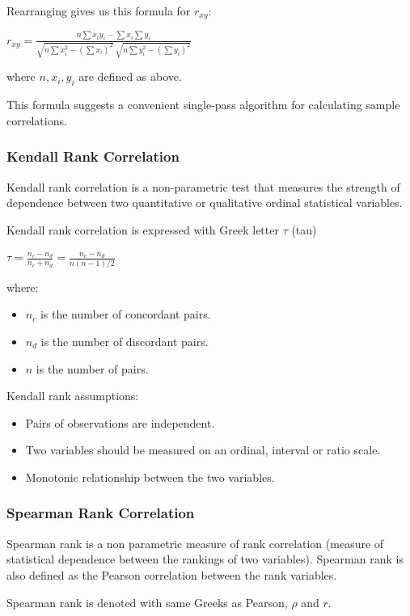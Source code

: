 \documentclass{article}
\begin{document}
Rearranging gives us this formula for $\displaystyle r_{xy}$:

${\displaystyle r_{xy}={\frac {n\sum x_{i}y_{i}-\sum x_{i}\sum y_{i}}{{\sqrt {n\sum x_{i}^{2}-\left(\sum x_{i}\right)^{2}}}~{\sqrt {n\sum y_{i}^{2}-\left(\sum y_{i}\right)^{2}}}}}}$

where $n,x_{i},y_{i}$ are defined as above.

This formula suggests a convenient single-pass algorithm for calculating sample correlations.

\subsubsection{Kendall Rank Correlation}
Kendall rank correlation is a non-parametric test that measures the strength of dependence between two quantitative or qualitative ordinal statistical variables. 

Kendall rank correlation is expressed with Greek letter $\tau$ (tau)

$\displaystyle \tau = \frac{n_c - n_d}{n_c + n_d} = \frac{n_c - n_d}{n(n - 1)/2}$

where:
\begin{itemize}
    \item $n_c$ is the number of concordant pairs.
    \item $n_d$ is the number of discordant pairs.
    \item $n$ is the number of pairs.
\end{itemize}

Kendall rank assumptions:
\begin{itemize}
    \item Pairs of observations are independent.
    \item Two variables should be measured on an ordinal, interval or ratio scale.
    \item Monotonic relationship between the two variables.
\end{itemize}

\subsubsection{Spearman Rank Correlation}
Spearman rank is a non parametric measure of rank correlation (measure of statistical dependence between the rankings of two variables). 
Spearman rank is also defined as the Pearson correlation between the rank variables.

Spearman rank is denoted with same Greeks as Pearson, $\rho$ and $r$.
\end{document}
